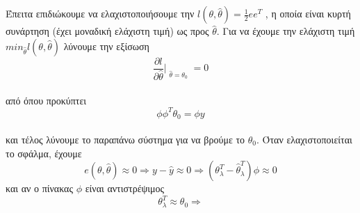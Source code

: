 \documentclass[12pt]{article}
\begin{document}
\\ \\
Έπειτα επιδιώκουμε να ελαχιστοποιήσουμε την $l(\theta,\hat{\theta})=\frac{1}{2}ee^{T}$ , η οποία είναι κυρτή συνάρτηση (έχει μοναδική ελάχιστη τιμή) ως προς $\hat{\theta}$.
Για να έχουμε την ελάχιστη τιμή \quad $min_{\hat{\theta}} l(\theta,\hat{\theta})$ λύνουμε την εξίσωση
\\ 
\[ \frac{ \partial l}{\partial \hat{\theta}}\Bigr|_{\substack{\hat{\theta} =\theta_{0}}}=0 \]
 \\
 από όπου προκύπτει 
 \[
 \phi\phi^{T}\theta_{0}=\phi y
\] 
 \\ 
και τέλος λύνουμε το παραπάνω σύστημα για να βρούμε το $\theta_{0}$. Όταν ελαχιστοποιείται το σφάλμα, έχουμε
 \\
\[ e(\theta,\hat{\theta})\approx 0 \Rightarrow y-\hat{y} \approx 0 \Rightarrow (\theta^{T}_{\lambda}-\hat{\theta}^{T}_{\lambda})\phi \approx 0\] 
και αν ο πίνακας $\phi$ είναι αντιστρέψιμος
\[\theta^{T}_{\lambda} \approx \theta_{0} \Rightarrow\]
 
\end{document}
